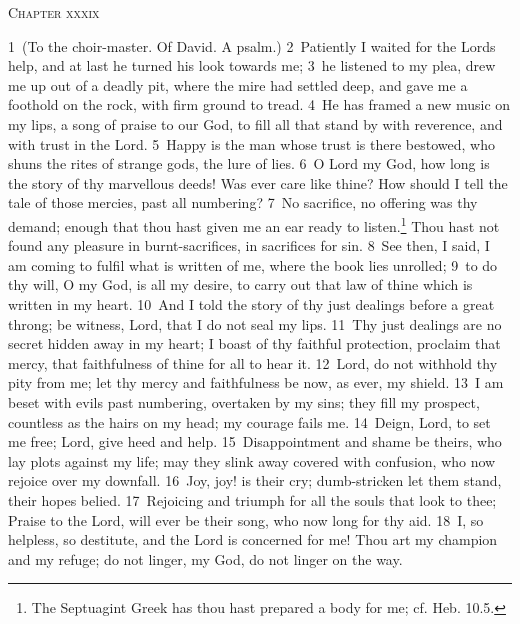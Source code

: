 \documentclass[10pt]{book} %
\begin{document}
\begin{large}\begin{center}\textsc{Chapter xxxix}\end{center}\end{large}
\textcolor{benred8}{1}~(To the choir-master. Of David. A psalm.)
\textcolor{benred8}{2}~Patiently I waited for the Lord\textquotesingle s help, and at last he turned his look towards me; \textcolor{benred8}{3}~he listened to my plea, drew me up out of a deadly pit, where the mire had settled deep, and gave me a foothold on the rock, with firm ground to tread. \textcolor{benred8}{4}~He has framed a new music on my lips, a song of praise to our God, to fill all that stand by with reverence, and with trust in the Lord. \textcolor{benred8}{5}~Happy is the man whose trust is there bestowed, who shuns the rites of strange gods, the lure of lies. \textcolor{benred8}{6}~O Lord my God, how long is the story of thy marvellous deeds! Was ever care like thine? How should I tell the tale of those mercies, past all numbering? \textcolor{benred8}{7}~No sacrifice, no offering was thy demand; enough that thou hast given me an ear ready to listen.\footnote[1]{The Septuagint Greek has \textasciigrave thou hast prepared a body for me\textquotesingle ; cf. Heb. 10.5.} Thou hast not found any pleasure in burnt-sacrifices, in sacrifices for sin. \textcolor{benred8}{8}~See then, I said, I am coming to fulfil what is written of me, where the book lies unrolled; \textcolor{benred8}{9}~to do thy will, O my God, is all my desire, to carry out that law of thine which is written in my heart. \textcolor{benred8}{10}~And I told the story of thy just dealings before a great throng; be witness, Lord, that I do not seal my lips. \textcolor{benred8}{11}~Thy just dealings are no secret hidden away in my heart; I boast of thy faithful protection, proclaim that mercy, that faithfulness of thine for all to hear it.
\textcolor{benred8}{12}~Lord, do not withhold thy pity from me; let thy mercy and faithfulness be now, as ever, my shield. \textcolor{benred8}{13}~I am beset with evils past numbering, overtaken by my sins; they fill my prospect, countless as the hairs on my head; my courage fails me. \textcolor{benred8}{14}~Deign, Lord, to set me free; Lord, give heed and help. \textcolor{benred8}{15}~Disappointment and shame be theirs, who lay plots against my life; may they slink away covered with confusion, who now rejoice over my downfall. \textcolor{benred8}{16}~Joy, joy! is their cry; dumb-stricken let them stand, their hopes belied. \textcolor{benred8}{17}~Rejoicing and triumph for all the souls that look to thee; Praise to the Lord, will ever be their song, who now long for thy aid. \textcolor{benred8}{18}~I, so helpless, so destitute, and the Lord is concerned for me! Thou art my champion and my refuge; do not linger, my God, do not linger on the way.
\end{document}
